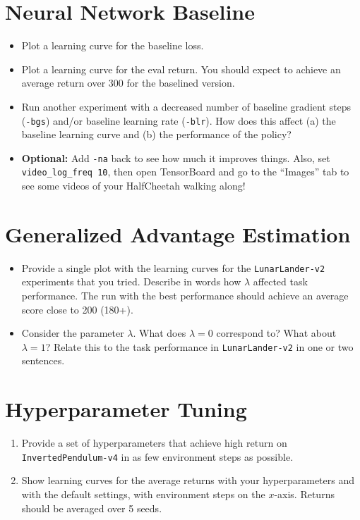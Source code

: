 \documentclass{article}
\begin{document}
\newpage\section{Neural Network Baseline}
\begin{itemize}
    \item Plot a learning curve for the baseline loss.
    \item Plot a learning curve for the eval return. You should expect to achieve an average return over 300 for the baselined version.
    \item Run another experiment with a decreased number of baseline gradient steps (\verb|-bgs|) and/or baseline learning rate (\verb|-blr|). How does this affect (a) the baseline learning curve and (b) the performance of the policy?
    \item \textbf{Optional:} Add \verb|-na| back to see how much it improves things. Also, set \verb|video_log_freq 10|, then open TensorBoard and go to the ``Images'' tab to see some videos of your HalfCheetah walking along!
\end{itemize}

\newpage\section{Generalized Advantage Estimation}
\begin{itemize}
    \item Provide a single plot with the learning curves for the \verb|LunarLander-v2| experiments that you tried. Describe in words how $\lambda$ affected task performance. The run with the best performance should achieve an average score close to 200 (180+).
    \item Consider the parameter $\lambda$. What does $\lambda = 0$ correspond to? What about $\lambda = 1$? Relate this to the task performance in \verb|LunarLander-v2| in one or two sentences.
\end{itemize}

\newpage\section{Hyperparameter Tuning}
\begin{enumerate}
    \item Provide a set of hyperparameters that achieve high return on \verb|InvertedPendulum-v4| in as few environment steps as possible.
    \item Show learning curves for the average returns with your hyperparameters and with the default settings, with environment steps on the $x$-axis. Returns should be averaged over 5 seeds.
\end{enumerate}
\end{document}
